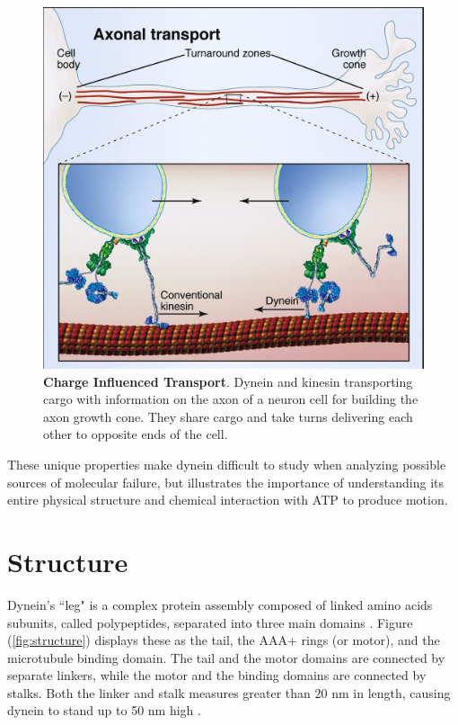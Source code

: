 \begin{figure}[H]
	\centering
	\includegraphics[width=0.6\columnwidth]{Figures/retrograde_transport.jpg}
	\caption[Charge Influenced Transport]{\textbf{Charge Influenced Transport}. Dynein and kinesin transporting cargo with information on the axon of a neuron cell for building the axon growth cone. They share cargo and take turns delivering each other to opposite ends of the cell. \cite{Vale2003molecular}}
	\label{fig:transport}
\end{figure}

These unique properties make dynein difficult to study when analyzing possible sources of molecular failure, but illustrates the importance of understanding its entire physical structure and chemical interaction with ATP to produce motion.

\newpage
\section{Structure}

Dynein's ``leg" is a complex protein assembly composed of linked amino acids subunits, called polypeptides, separated into three main domains \cite{Burgess2003}. Figure (\ref{fig:structure}) displays these as the tail, the AAA+ rings (or motor), and the microtubule binding domain. The tail and the motor domains are connected by separate linkers, while the motor and the binding domains are connected by stalks. Both the linker and stalk measures greater than 20 nm in length, causing dynein to stand up to 50 nm high \cite{Burgess2003}. 

